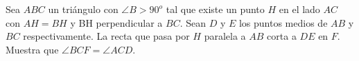 Sea $ABC$ un triángulo con $\angle B > 90^o$ tal que existe un punto $H$ en el lado $AC$ con $AH = BH$ y BH perpendicular a $BC$. Sean $D$ y $E$ los puntos medios de $AB$ y $BC$ respectivamente. La recta que pasa por $H$ paralela a $AB$ corta a $DE$ en $F$. Muestra que $\angle BCF = \angle ACD$. 
